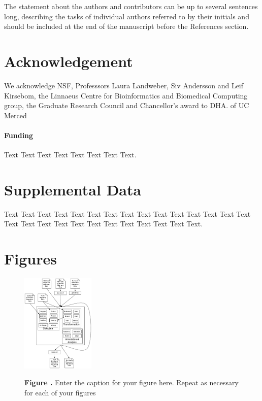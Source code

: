 \documentclass{frontiersSCNS} %
\begin{document}
The statement about the authors and contributors can be up to several sentences long, describing the tasks of individual authors referred to by their initials and should be included at the end of the manuscript before the References section.


\section*{Acknowledgement}
We acknowledge NSF, Professsors Laura Landweber, Siv Andersson and
Leif Kirsebom, the Linnaeus Centre for Bioinformatics and Biomedical
Computing group, the Graduate Research Council and Chancellor's award
 to DHA. of UC Merced

\paragraph{Funding\textcolon} Text Text Text Text Text Text  Text Text.

\section*{Supplemental Data}
Text Text Text Text Text Text  Text Text Text Text Text Text Text Text Text  Text Text Text Text Text Text Text Text Text  Text Text Text.



\section*{Figures}


\begin{figure}
\begin{center}
\includegraphics[width=3.5cm]{FAST_v2}%
\end{center}
 \textbf{\label{fig:01} Figure .}{ Enter the caption for your figure here.  Repeat as  necessary for each of your figures }
\end{figure}
\end{document}
